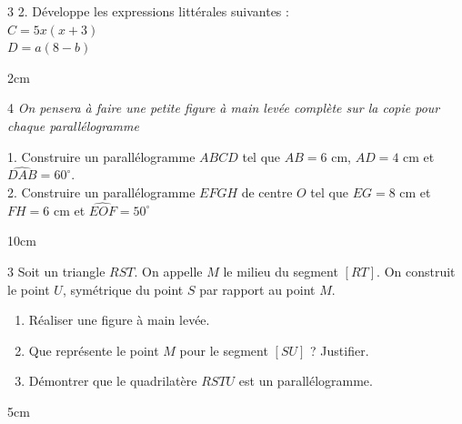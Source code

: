 \documentclass[a4paper]{book}
\begin{document}
{\begin{exerciceNote}{3}
        2. Développe les expressions littérales suivantes :\\
        $C = 5x(x + 3)$\\
        $D = a(8 - b)$
        \begin{ZoneReponse}{2cm}
        \end{ZoneReponse}
    \end{exerciceNote}


\newpage

    
    \begin{exerciceNote}{4}
        \textit{On pensera à faire une petite figure à main levée complète sur la copie pour chaque parallélogramme}
        
        1. Construire un parallélogramme $ABCD$ tel que $AB = 6$ cm, $AD = 4$ cm et $\widehat{DAB} = 60^\circ$.\\
        2. Construire un parallélogramme $EFGH$ de centre $O$ tel que $EG = 8$ cm et $FH = 6$ cm et $\widehat{EOF}=50^{\circ}$
        
        \begin{ZoneReponse}{10cm}
        \end{ZoneReponse}
    \end{exerciceNote}


    \begin{exerciceNote}{3}
        Soit un triangle $RST$. On appelle $M$ le milieu du segment $[RT]$.
        On construit le point $U$, symétrique du point $S$ par rapport au point $M$.
        
        \begin{enumerate}
            \item Réaliser une figure à main levée.
            \item Que représente le point $M$ pour le segment $[SU]$ ? Justifier.
            \item Démontrer que le quadrilatère $RS T U$ est un parallélogramme.
        \end{enumerate}

        \begin{ZoneReponse}{5cm}
        \end{ZoneReponse}
    \end{exerciceNote}


}
\end{document}
